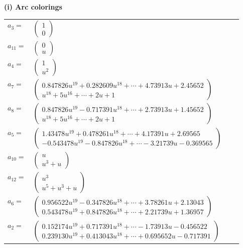 \documentclass[1p]{elsarticle_modified}
\theoremstyle{definition}
\begin{document}
\flushleft \textbf{(i) Arc colorings}\\
\begin{tabular}{m{7pt} m{180pt} m{7pt} m{180pt} }
\flushright $a_{3}=$&$\begin{pmatrix}1\\0\end{pmatrix}$ \\
\flushright $a_{11}=$&$\begin{pmatrix}0\\u\end{pmatrix}$ \\
\flushright $a_{4}=$&$\begin{pmatrix}1\\u^2\end{pmatrix}$ \\
\flushright $a_{7}=$&$\begin{pmatrix}0.847826 u^{19}+0.282609 u^{18}+\cdots+4.73913 u+2.45652\\u^{18}+5 u^{16}+\cdots+2 u+1\end{pmatrix}$ \\
\flushright $a_{8}=$&$\begin{pmatrix}0.847826 u^{19}-0.717391 u^{18}+\cdots+2.73913 u+1.45652\\u^{18}+5 u^{16}+\cdots+2 u+1\end{pmatrix}$ \\
\flushright $a_{5}=$&$\begin{pmatrix}1.43478 u^{19}+0.478261 u^{18}+\cdots+4.17391 u+2.69565\\-0.543478 u^{19}-0.847826 u^{18}+\cdots-3.21739 u-0.369565\end{pmatrix}$ \\
\flushright $a_{10}=$&$\begin{pmatrix}u\\u^3+u\end{pmatrix}$ \\
\flushright $a_{12}=$&$\begin{pmatrix}u^3\\u^5+u^3+u\end{pmatrix}$ \\
\flushright $a_{6}=$&$\begin{pmatrix}0.956522 u^{19}-0.347826 u^{18}+\cdots+3.78261 u+2.13043\\0.543478 u^{19}+0.847826 u^{18}+\cdots+2.21739 u+1.36957\end{pmatrix}$ \\
\flushright $a_{2}=$&$\begin{pmatrix}0.152174 u^{19}+0.717391 u^{18}+\cdots-1.73913 u-0.456522\\0.239130 u^{19}+0.413043 u^{18}+\cdots+0.695652 u-0.717391\end{pmatrix}$ \\

\end{tabular}
\end{document}
